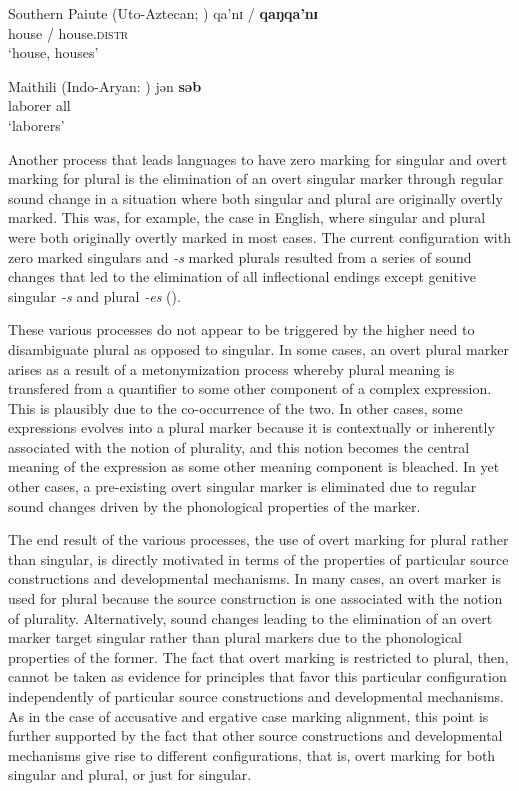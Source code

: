 \documentclass[output=paper]{langsci/langscibook}
\begin{document}
\ea\label{paiute}
Southern Paiute (Uto-Aztecan; \citealt[258]{Sapir1930})
\gll qa'nɪ​ / \textbf{{qaŋqa'nɪ​}}\\
house / house.\textsc{distr}\\
\glt `house, houses'
\nocite{Paiute}

\z

\ea\label{maithili}
Maithili (Indo-Aryan: )
\gll jən \textbf{{səb}}\\
laborer all\\
\glt `laborers'

\z

Another process that leads languages to have zero marking for singular
and overt marking for plural is the elimination of an overt singular
marker through regular sound change in a situation where both singular
and plural are originally overtly marked. This was, for example, the case in
English, where singular and plural were both originally overtly
  marked in most cases. The current
configuration with zero marked singulars and {\em -s} marked plurals
resulted from a series of sound changes that led to the
elimination of all inflectional endings except genitive singular {\em
  -s} and plural {\em -es} (\citealt{Mosse}). 


These various processes do not appear to be triggered by the higher need to
disambiguate plural as opposed to singular. In some cases, an overt
plural marker arises as a result of a metonymization
process whereby plural meaning is transfered from a quantifier to some
other component of a complex expression. This is plausibly due to the
co-occurrence of the two. In other cases, some
expressions evolves into a plural marker because it is contextually or
inherently associated with the notion of plurality, and this notion becomes the
central meaning of the expression as some other meaning component is
bleached.  In yet
other cases, a pre-existing overt singular marker is eliminated due to
regular sound changes driven by the phonological  properties of the
marker. 

The end result of the various processes, the use of  overt marking for
plural rather than singular, is  directly motivated in
terms of the properties of particular source constructions and
developmental mechanisms.  In many cases,  an overt
marker is  used for plural because the source construction is one associated with the notion of
plurality. Alternatively, sound changes leading to the elimination of
an overt marker target singular rather than plural markers due to the
phonological properties of the former. The fact that overt marking
is restricted to plural, then, cannot be taken as evidence for
principles that favor this particular configuration independently of
particular source constructions and developmental mechanisms. As in
the case of accusative and ergative case marking alignment, this point
is further supported by the fact that other source
constructions and developmental mechanisms give rise to different
configurations, that is, overt marking for both singular and plural,
or just for singular.
\end{document}
